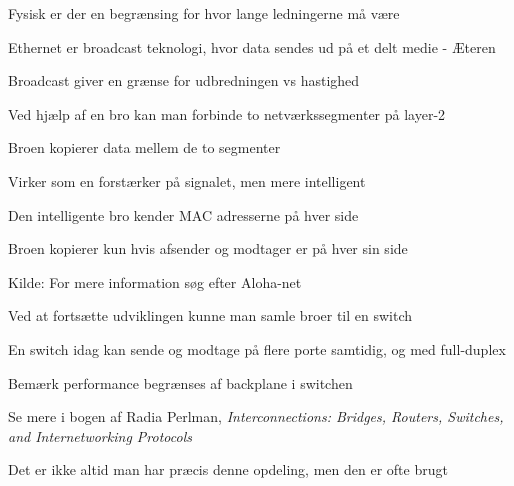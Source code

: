 \documentclass[Screen16to9,17pt]{foils}
\begin{document}

\centerline{Fysisk er der en begrænsing for hvor lange ledningerne må være}


\begin{list1}
\item Ethernet er broadcast teknologi, hvor data sendes ud på et delt medie - Æteren
\item Broadcast giver en grænse for udbredningen vs hastighed
\item Ved hjælp af en bro kan man forbinde to netværkssegmenter på layer-2
\item Broen kopierer data mellem de to segmenter
\item Virker som en forstærker på signalet, men mere intelligent
\item Den intelligente bro kender MAC adresserne på hver side
\item Broen kopierer kun hvis afsender og modtager er på hver sin side
\end{list1}

Kilde: For mere information søg efter Aloha-net\\ 




\begin{list1}
\item Ved at fortsætte udviklingen kunne man samle broer til en switch
\item En switch idag kan sende og modtage på flere porte samtidig, og med full-duplex
\item Bemærk performance begrænses af backplane i switchen
\end{list1}



Se mere i bogen af Radia Perlman, \emph{Interconnections: Bridges, Routers, Switches, and Internetworking Protocols}




\centerline{Det er ikke altid man har præcis denne opdeling, men den er ofte brugt}




\end{document}
